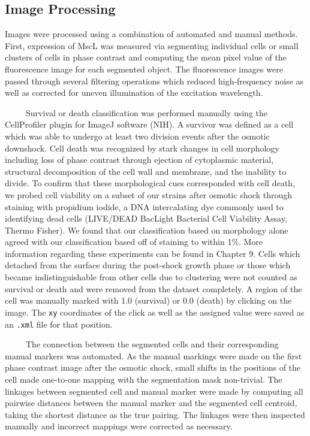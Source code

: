 \documentclass[12pt]{caltech_thesis}
\begin{document}
\hypertarget{image-processing}{%
\subsection{Image Processing}\label{image-processing}}

Images were processed using a combination of automated and manual
methods. First, expression of MscL was measured via segmenting
individual cells or small clusters of cells in phase contrast and
computing the mean pixel value of the fluorescence image for each
segmented object. The fluorescence images were passed through several
filtering operations which reduced high-frequency noise as well as
corrected for uneven illumination of the excitation wavelength.

~~~~~Survival or death classification was performed manually using the
CellProfiler plugin for ImageJ software (NIH). A survivor was defined as
a cell which was able to undergo at least two division events after the
osmotic downshock. Cell death was recognized by stark changes in cell
morphology including loss of phase contrast through ejection of
cytoplasmic material, structural decomposition of the cell wall and
membrane, and the inability to divide. To confirm that these
morphological cues corresponded with cell death, we probed cell
viability on a subset of our strains after osmotic shock through
staining with propidium iodide, a DNA intercalating dye commonly used to
identifying dead cells (LIVE/DEAD BacLight Bacterial Cell Viability
Assay, Thermo Fisher). We found that our classification based on
morphology alone agreed with our classification based off of staining to
within 1\%. More information regarding these experiments can be found in
Chapter 9. Cells which detached from the surface during the post-shock
growth phase or those which became indistinguishable from other cells
due to clustering were not counted as survival or death and were removed
from the dataset completely. A region of the cell was manually marked
with 1.0 (survival) or 0.0 (death) by clicking on the image. The
\texttt{xy} coordinates of the click as well as the assigned value were
saved as an \texttt{.xml} file for that position.

~~~~~The connection between the segmented cells and their corresponding
manual markers was automated. As the manual markings were made on the
first phase contrast image after the osmotic shock, small shifts in the
positions of the cell made one-to-one mapping with the segmentation mask
non-trivial. The linkages between segmented cell and manual marker were
made by computing all pairwise distances between the manual marker and
the segmented cell centroid, taking the shortest distance as the true
pairing. The linkages were then inspected manually and incorrect
mappings were corrected as necessary.
\end{document}
